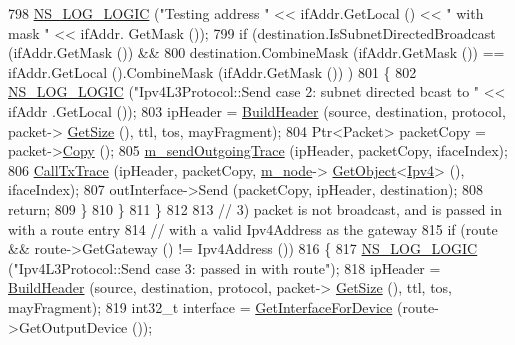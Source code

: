 \begin{DoxyCode}
798           \hyperlink{group__logging_ga88acd260151caf2db9c0fc84997f45ce}{NS\_LOG\_LOGIC} (\textcolor{stringliteral}{"Testing address "} << ifAddr.GetLocal () << \textcolor{stringliteral}{" with mask "} << ifAddr.
      GetMask ());
799           \textcolor{keywordflow}{if} (destination.IsSubnetDirectedBroadcast (ifAddr.GetMask ()) && 
800               destination.CombineMask (ifAddr.GetMask ()) == ifAddr.GetLocal ().CombineMask (ifAddr.GetMask
       ())   )
801             \{
802               \hyperlink{group__logging_ga88acd260151caf2db9c0fc84997f45ce}{NS\_LOG\_LOGIC} (\textcolor{stringliteral}{"Ipv4L3Protocol::Send case 2:  subnet directed bcast to "} << ifAddr
      .GetLocal ());
803               ipHeader = \hyperlink{classns3_1_1Ipv4L3Protocol_a3737569960c655fe5441b21a5ef829d3}{BuildHeader} (source, destination, protocol, packet->
      \hyperlink{classns3_1_1Packet_a462855c9929954d4301a4edfe55f4f1c}{GetSize} (), ttl, tos, mayFragment);
804               Ptr<Packet> packetCopy = packet->\hyperlink{classns3_1_1Packet_a5d5c70802a5f77fc5f0001e0cfc1898b}{Copy} ();
805               \hyperlink{classns3_1_1Ipv4L3Protocol_a909297aa7ca87db2b7c91daefa2ed40a}{m\_sendOutgoingTrace} (ipHeader, packetCopy, ifaceIndex);
806               \hyperlink{classns3_1_1Ipv4L3Protocol_a04cbb7540c6f22a2870f118715b6a703}{CallTxTrace} (ipHeader, packetCopy, \hyperlink{classns3_1_1Ipv4L3Protocol_ad2cc5076c247724f1e99b398edc1965a}{m\_node}->
      \hyperlink{classns3_1_1Object_a13e18c00017096c8381eb651d5bd0783}{GetObject}<\hyperlink{classns3_1_1Ipv4_a1c15284fe630c76e0c9c75a97f1ff234}{Ipv4}> (), ifaceIndex);
807               outInterface->Send (packetCopy, ipHeader, destination);
808               \textcolor{keywordflow}{return};
809             \}
810         \}
811     \}
812 
813   \textcolor{comment}{// 3) packet is not broadcast, and is passed in with a route entry}
814   \textcolor{comment}{//    with a valid Ipv4Address as the gateway}
815   \textcolor{keywordflow}{if} (route && route->GetGateway () != Ipv4Address ())
816     \{
817       \hyperlink{group__logging_ga88acd260151caf2db9c0fc84997f45ce}{NS\_LOG\_LOGIC} (\textcolor{stringliteral}{"Ipv4L3Protocol::Send case 3:  passed in with route"});
818       ipHeader = \hyperlink{classns3_1_1Ipv4L3Protocol_a3737569960c655fe5441b21a5ef829d3}{BuildHeader} (source, destination, protocol, packet->
      \hyperlink{classns3_1_1Packet_a462855c9929954d4301a4edfe55f4f1c}{GetSize} (), ttl, tos, mayFragment);
819       int32\_t \textcolor{keyword}{interface }= \hyperlink{classns3_1_1Ipv4L3Protocol_a4640baab6b3879020a4146f17e293321}{GetInterfaceForDevice} (route->GetOutputDevice ());

\end{DoxyCode}

